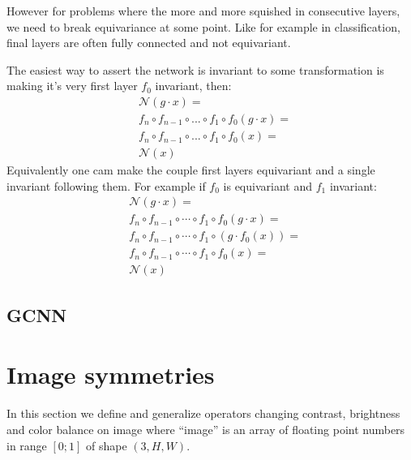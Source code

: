         However for problems where the more and more squished in consecutive layers,
        we need to break equivariance at some point. Like for example in classification,
        final layers are often fully connected and not equivariant. \par
        The easiest way to assert the network is invariant to some transformation
        is making it's very first layer $f_0$ invariant, then:
        \begin{align*}
            & \mathcal{N}(g\cdot x) = \\
            & f_n \circ f_{n-1} \circ ... \circ f_1 \circ f_0(g\cdot x) =  \\
            & f_n \circ f_{n-1} \circ ... \circ f_1 \circ f_0(x) = \\
            & \mathcal{N}(x)
        \end{align*}
        Equivalently one cam make the couple first layers equivariant and a single invariant
        following them. For example if $f_0$ is equivariant and $f_1$ invariant:
        \begin{align*}
            & \mathcal{N}(g\cdot x) = \\
            & f_n \circ f_{n-1} \circ \cdots \circ f_1 \circ f_0(g\cdot x) =  \\
            & f_n \circ f_{n-1} \circ \cdots \circ f_1 \circ \left( g \cdot f_0(x) \right) = \\
            & f_n \circ f_{n-1} \circ \cdots \circ f_1 \circ f_0(x) = \\
            & \mathcal{N}(x)
        \end{align*}

    \subsection{GCNN}

\section{Image symmetries}
    In this section we define and generalize operators changing contrast, brightness
    and color balance on image where ``image'' is an array of floating point numbers
    in range $\left[0;1\right]$ of shape $\left(3, H, W\right)$.
